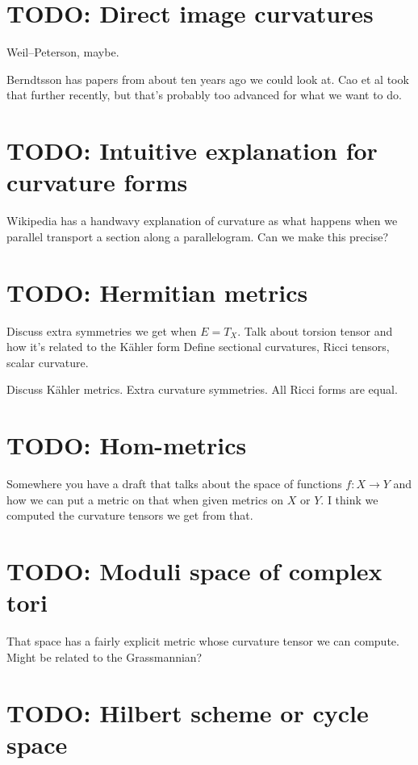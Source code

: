 \documentclass[11pt]{article}
\theoremstyle{definition}
\begin{document}
\section{TODO: Direct image curvatures}
\label{sec:org5619e67}

Weil--Peterson, maybe.

Berndtsson has papers from about ten years ago we could look at. Cao et al took that further recently, but that's probably too advanced for what we want to do.


\section{TODO: Intuitive explanation for curvature forms}
\label{sec:org2b43ecb}

Wikipedia has a handwavy explanation of curvature as what happens when we parallel transport a section along a parallelogram. Can we make this precise?



\section{TODO: Hermitian metrics}
\label{sec:orgad8dbb1}

Discuss extra symmetries we get when \(E = T_X\).
Talk about torsion tensor and how it's related to the K\"ahler form
Define sectional curvatures, Ricci tensors, scalar curvature.

Discuss K\"ahler metrics. Extra curvature symmetries. All Ricci forms are equal.


\section{TODO: Hom-metrics}

Somewhere you have a draft that talks about the space of functions $f : X \to Y$ and how we can put a metric on that when given metrics on $X$ or $Y$. I think we computed the curvature tensors we get from that.


\section{TODO: Moduli space of complex tori}

That space has a fairly explicit metric whose curvature tensor we can compute. Might be related to the Grassmannian?


\section{TODO: Hilbert scheme or cycle space}
\end{document}
